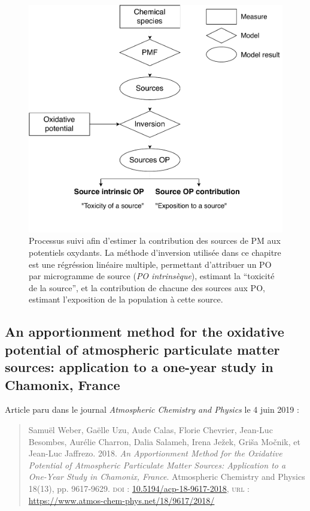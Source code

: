 \begin{figure}[ht]
    \centering
    \includegraphics[width=0.8\linewidth]{figures/chapter04/flowchart_inversion.pdf}
    \caption{Processus suivi afin d'estimer la contribution des sources de PM aux
        potentiels oxydants. La méthode d'inversion utilisée dans ce chapitre est une
        régréssion linéaire multiple, permettant d'attribuer un PO par microgramme de source
        (\textit{PO intrinsèque}), estimant la ``toxicité de la source'', et la contribution de
    chacune des sources aux PO, estimant l'exposition de la population à cette source.}%
    \label{fig:workflow_inversion}
\end{figure}

\clearpage
\subsection{An apportionment method for the oxidative potential of atmospheric particulate
matter sources: application to a one-year study in Chamonix, France}
\label{sec:weber_et_al_2018}

Article paru dans le journal \textit{Atmospheric Chemistry and Physics} le 4 juin 2019 :

\begin{quote}
    Samuël Weber, Gaëlle Uzu, Aude Calas, Florie Chevrier, Jean-Luc Besombes,
    Aurélie Charron, Dalia Salameh, Irena Ježek, Griša Močnik, et Jean-Luc Jaffrezo. 2018.
    \textit{An Apportionment Method for the Oxidative Potential of Atmospheric Particulate
    Matter Sources: Application to a One-Year Study in Chamonix, France}. Atmospheric
    Chemistry and Physics 18(13), pp. 9617‑9629.
    \textsc{doi} : \href{https://doi.org/10.5194/acp-18-9617-2018}{10.5194/acp-18-9617-2018},
    \textsc{url} : \url{https://www.atmos-chem-phys.net/18/9617/2018/}
\end{quote}

